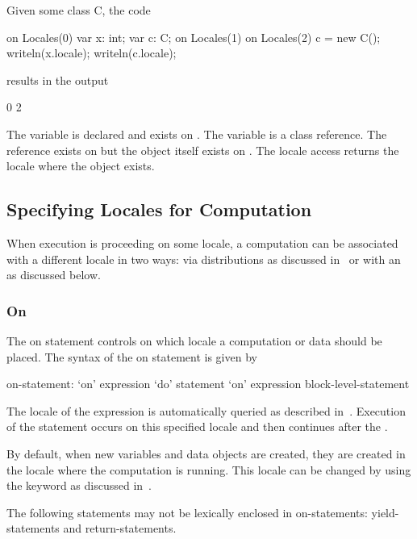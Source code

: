 \begin{example}
Given some class C, the code
\begin{chapel}
on Locales(0) {
  var x: int;
  var c: C;
  on Locales(1) {
    on Locales(2) {
      c = new C();
    }
    writeln(x.locale);
    writeln(c.locale);
  }
}
\end{chapel}
results in the output
\begin{chapel}
0
2
\end{chapel}
The variable  is declared and exists on .
The variable  is a class reference.  The reference exists
on  but the object itself exists
on .  The locale access returns the locale where the
object exists.
\end{example}

\subsection{Specifying Locales for Computation}
\label{Specifying_Locales_for_Computation}

When execution is proceeding on some locale, a computation can be
associated with a different locale in two ways: via distributions as
discussed in~ or with an  as
discussed below.

\subsubsection{On}
\label{On}

The on statement controls on which locale a computation or data should
be placed.  The syntax of the on statement is given by
\begin{syntax}
on-statement:
  `on' expression `do' statement
  `on' expression block-level-statement
\end{syntax}
The locale of the expression is automatically queried as described
in~.  Execution of the
statement occurs on this specified locale and then continues after
the .

By default, when new variables and data objects are created, they are
created in the locale where the computation is running.  This locale
can be changed by using the  keyword as discussed
in~.

The following statements may not be lexically enclosed in
on-statements: yield-statements and return-statements.

